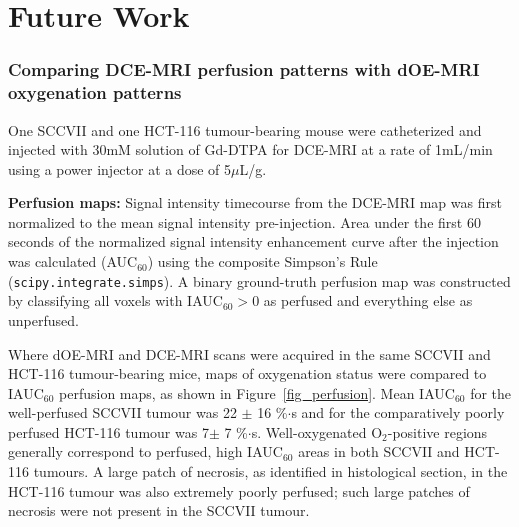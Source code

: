 
\chapter{Future Work}
\label{ch:futurework}


\subsection{Comparing DCE-MRI perfusion patterns with \ac{dOE-MRI} oxygenation patterns}

One SCCVII and one HCT-116 tumour-bearing mouse were catheterized and injected with 30mM solution of Gd-DTPA for DCE-MRI at a rate of 1mL/min using a power injector at a dose of 5$\mu$L/g.

\noindent\textbf{Perfusion maps:} Signal intensity timecourse from the DCE-MRI map was first normalized to the mean signal intensity pre-injection.
Area under the first 60 seconds of the normalized signal intensity enhancement curve after the injection was calculated (\acs{AUC}$_{60}$) using the composite Simpson's Rule (\texttt{scipy.integrate.simps}).
A binary ground-truth perfusion map was constructed by classifying all voxels with IAUC$_{60} > 0$ as perfused and everything else as unperfused.

Where \ac{dOE-MRI} and DCE-MRI scans were acquired in the same SCCVII and HCT-116 tumour-bearing mice,  maps of oxygenation status were compared to IAUC$_{60}$ perfusion maps, as shown in Figure~\ref{fig_perfusion}.
Mean IAUC$_{60}$ for the well-perfused SCCVII tumour was 22 $\pm$ 16 \%$\cdot$s and for the comparatively poorly perfused HCT-116 tumour was 7$\pm$ 7 \%$\cdot$s.
Well-oxygenated O$_2$-positive regions generally correspond to perfused, high IAUC$_{60}$ areas in both SCCVII and HCT-116 tumours.
A large patch of necrosis, as identified in histological section, in the HCT-116 tumour was also extremely poorly perfused; such large patches of necrosis were not present in the SCCVII tumour.

